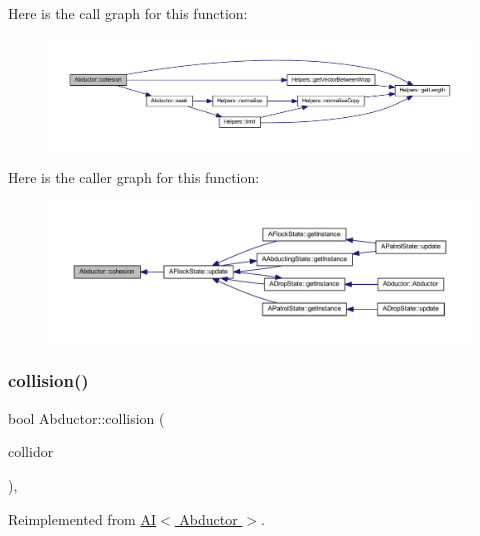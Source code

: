 Here is the call graph for this function\+:
\nopagebreak
\begin{figure}[H]
\begin{center}
\leavevmode
\includegraphics[width=350pt]{class_abductor_ad1660967efd5c4abcdee49989a966722_cgraph}
\end{center}
\end{figure}
Here is the caller graph for this function\+:
\nopagebreak
\begin{figure}[H]
\begin{center}
\leavevmode
\includegraphics[width=350pt]{class_abductor_ad1660967efd5c4abcdee49989a966722_icgraph}
\end{center}
\end{figure}
\mbox{\label{class_abductor_a247dff8e49fc656700c8cb16ed08252d}} 
\subsubsection{\texorpdfstring{collision()}{collision()}}
{\footnotesize\ttfamily bool Abductor\+::collision (\begin{DoxyParamCaption}\item[{const std\+::shared\+\_\+ptr$<$ \hyperlink{class_game_object}{Game\+Object} $>$ \&}]{collidor }\end{DoxyParamCaption})\hspace{0.3cm}{\ttfamily [override]}, {\ttfamily [virtual]}}



Reimplemented from \hyperlink{class_a_i_a15f7ffd56bf48c7475f9b50d82b60528}{A\+I$<$ Abductor $>$}.

